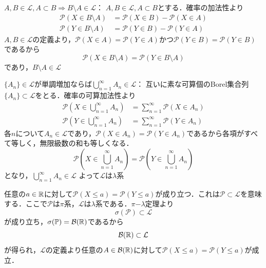 \documentclass[dvipdfmx, leqno]{jsbook}
\begin{document}
\begin{souanswer}
\begin{enumerate_alpha}
	\item $A, B\in \mathcal{L}, A\subset B\Rightarrow B\setminus A\in \mathcal{L}$：
	$A, B\in \mathcal{L}, A\subset B$とする．確率の加法性より
\begin{align}
	\mathcal{P}(X\in B\setminus A)&= \mathcal{P}(X\in B)- \mathcal{P}(X\in A)\\
	\mathcal{P}(Y\in B\setminus A)&= \mathcal{P}(Y\in B)- \mathcal{P}(Y\in A)
\end{align}
	$A, B\in \mathcal{L}$の定義より，$\mathcal{P}(X\in A)= \mathcal{P}(Y\in A)$かつ$\mathcal{P}(Y\in B)= \mathcal{P}(Y\in B)$であるから
\begin{equation}
	\mathcal{P}(X\in B\setminus A)= \mathcal{P}(Y\in B\setminus A)
\end{equation}
	であり，$B\setminus A\in \mathcal{L}$
	\item $\{A_n\}\in \mathcal{L}$が単調増加ならば$\bigcup_{n= 1}^\infty A_n\in \mathcal{L}$：
	互いに素な可算個のBorel集合列$\{A_n\}\subset \mathcal{L}$をとる．確率の可算加法性より
\begin{align}
	\mathcal{P}\left(X\in \bigcup_{n= 1}^\infty A_n\right)&= \sum_{n= 1}^\infty \mathcal{P}(X\in A_n)\\
	\mathcal{P}\left(Y\in \bigcup_{n= 1}^\infty A_n\right)&= \sum_{n= 1}^\infty \mathcal{P}(Y\in A_n)
\end{align}
	各$n$について$A_n\in \mathcal{L}$であり，$\mathcal{P}(X\in A_n)= \mathcal{P}(Y\in A_n)$であるから各項がすべて等しく，無限級数の和も等しくなる．
\begin{equation}
	\mathcal{P}\left(X\in \bigcup_{n= 1}^\infty A_n\right)= \mathcal{P}\left(Y\in \bigcup_{n= 1}^\infty A_n\right)
\end{equation}
	となり，$\bigcup_{n= 1}^\infty A_n\in \mathcal{L}$
	よって$\mathcal{L}$は$\lambda$系
\end{enumerate_alpha}
	任意の$a\in \mathbb{R}$に対して$\mathcal{P}(X\le a)= \mathcal{P}(Y\le a)$が成り立つ．これは$\mathcal{P}\subset \mathcal{L}$を意味する．ここで$\mathcal{P}$は$\pi$系，$\mathcal{L}$は$\lambda$系である．$\pi\mathrm{-}\lambda$定理より
\begin{equation}
	\sigma(\mathcal{P})\subset \mathcal{L}
\end{equation}
	が成り立ち，$\sigma(\mathbb{P})= \mathcal{B}(\mathbb{R})$であるから
\begin{equation}
	\mathcal{B}(\mathbb{R})\subset \mathcal{L}
\end{equation}
	が得られ，$\mathcal{L}$の定義より任意の$A\in \mathcal{B}(\mathbb{R})$に対して$\mathcal{P}(X\le a)= \mathcal{P}(Y\le a)$が成立．
\end{souanswer}
\end{document}

